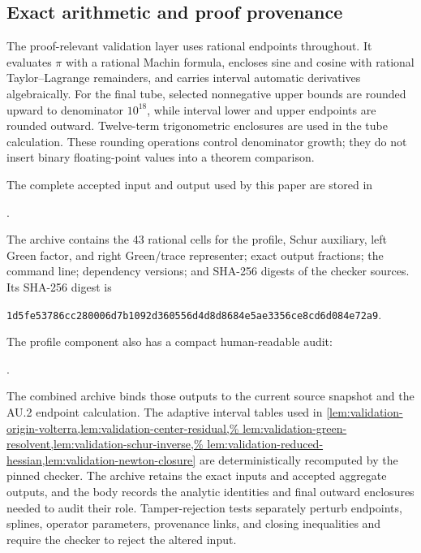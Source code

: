 \subsection{Exact arithmetic and proof provenance}

The proof-relevant validation layer uses rational endpoints throughout.  It evaluates
$\pi$ with a rational Machin formula, encloses sine and cosine with rational
Taylor--Lagrange remainders, and carries interval automatic derivatives
algebraically.  For the final tube, selected nonnegative upper bounds are
rounded upward to denominator $10^{18}$, while interval lower and upper
endpoints are rounded outward.  Twelve-term trigonometric enclosures are used
in the tube calculation.  These rounding operations control denominator
growth; they do not insert binary floating-point values into a theorem
comparison.

The complete accepted input and output used by this paper are stored in
\begin{center}
.
\end{center}
The archive contains the 43 rational cells for the profile, Schur auxiliary,
left Green factor, and right Green/trace representer; exact output fractions;
the command line; dependency versions; and SHA-256 digests of the checker
sources.  Its
SHA-256 digest is
\begin{center}
\texttt{1d5fe53786cc280006d7b1092d360556d4d8d8684e5ae3356ce8cd6d084e72a9}.
\end{center}
The profile component also has a compact human-readable audit:
\begin{center}
.
\end{center}
The combined archive binds those outputs to the current source snapshot and
the AU.2 endpoint calculation.
The adaptive interval tables used in
\cref{lem:validation-origin-volterra,lem:validation-center-residual,%
lem:validation-green-resolvent,lem:validation-schur-inverse,%
lem:validation-reduced-hessian,lem:validation-newton-closure}
are deterministically recomputed by the pinned checker.  The archive retains
the exact inputs and accepted aggregate outputs, and the body records the
analytic identities and final outward enclosures needed to audit their role.
Tamper-rejection tests separately perturb endpoints,
splines, operator parameters, provenance links, and closing inequalities and
require the checker to reject the altered input.
